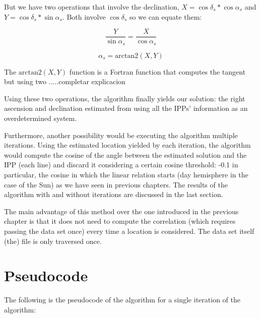 But we have two operations that involve the declination, $X=\cos\delta_{s} * \cos\alpha_{s}$ and $Y=\cos\delta_{s} * \sin\alpha_{s}$. Both involve $\cos\delta_{s}$ so we can equate them:

\begin{equation} \label{eq:rmCos}
\frac{Y}{\sin\alpha_{s}} = \frac{X}{\cos\alpha_{s}}
\end{equation}


\begin{equation} \label{eq:inverseTrigoAtan}
\alpha_{s} = \text{arctan2}(X,Y)
\end{equation}

The $\text{arctan2}(X,Y)$ function is a Fortran function that computes the tangent but using two .....completar explicacion

Using these two operations, the algorithm finally yields our solution: the right ascension and declination estimated from using all the IPPs' information as an overdetermined system.

Furthermore, another possibility would be executing the algorithm multiple iterations. Using the estimated location yielded by each iteration, the algorithm would compute the cosine of the angle between the estimated solution and the IPP (each line) and discard it considering a certain cosine threshold: -0.1 in particular, the cosine in which the linear relation starts (day hemisphere in the case of the Sun) as we have seen in previous chapters. The results of the algorithm with and without iterations are discussed in the last section.

The main advantage of this method over the one introduced in the previous chapter is that it does not need to compute the correlation (which requires passing the data set once) every time a location is considered. The data set itself (the) file is only traversed once.

\section{Pseudocode}

The following is the pseudocode of the algorithm for a single iteration of the algorithm:

